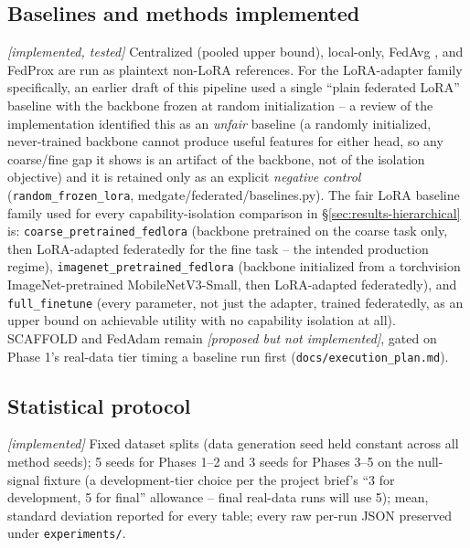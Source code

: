 \documentclass[11pt]{article}
\newcommand{\status}[1]{\textit{[#1]}}
\begin{document}
\subsection{Baselines and methods implemented} \status{implemented, tested}
Centralized (pooled upper bound), local-only, FedAvg \citep{mcmahan2017fedavg},
and FedProx \citep{li2020fedprox} are run as plaintext non-LoRA references.
For the LoRA-adapter family specifically, an earlier draft of this pipeline
used a single ``plain federated LoRA'' baseline with the backbone frozen at
random initialization -- a review of the implementation identified this as
an \emph{unfair} baseline (a randomly initialized, never-trained backbone
cannot produce useful features for either head, so any coarse/fine gap it
shows is an artifact of the backbone, not of the isolation objective) and it
is retained only as an explicit \emph{negative control}
(\texttt{random\_frozen\_lora}, medgate/federated/baselines.py). The fair
LoRA baseline family used for every capability-isolation comparison in
\S\ref{sec:results-hierarchical} is: \texttt{coarse\_pretrained\_fedlora}
(backbone pretrained on the coarse task only, then LoRA-adapted federatedly
for the fine task -- the intended production regime), \texttt{imagenet\_pretrained\_fedlora}
(backbone initialized from a torchvision ImageNet-pretrained MobileNetV3-Small,
then LoRA-adapted federatedly), and \texttt{full\_finetune} (every parameter,
not just the adapter, trained federatedly, as an upper bound on achievable
utility with no capability isolation at all). SCAFFOLD
\citep{karimireddy2020scaffold} and FedAdam \citep{reddi2021adaptive} remain
\status{proposed but not implemented}, gated on Phase 1's real-data tier
timing a baseline run first (\texttt{docs/execution\_plan.md}).

\subsection{Statistical protocol} \status{implemented}
Fixed dataset splits (data generation seed held constant across all method
seeds); 5 seeds for Phases 1--2 and 3 seeds for Phases 3--5 on the
null-signal fixture (a development-tier choice per the project brief's ``3
for development, 5 for final'' allowance -- final real-data runs will use
5); mean, standard deviation reported for every table; every raw per-run
JSON preserved under \texttt{experiments/}.
\end{document}
